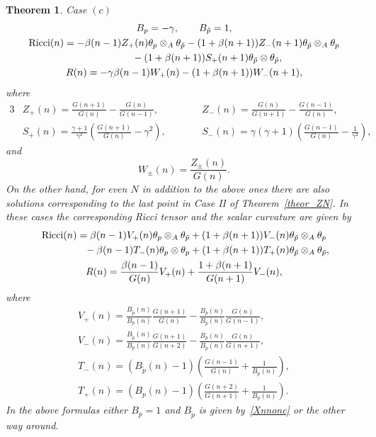\documentclass[10pt,a4paper]{amsart}
\numberwithin{equation}{section}
\newtheorem{Theorem}{Theorem}[section]
\newcommand{\ip}{{\tilde{p}}}
\begin{document}
\begin{Theorem}
Case $(c)$
\begin{gather*}
 B_p=-\gamma, \qquad B_\ip=1, \\
{\rm Ricci}(n) = -\beta(n-1)Z_+(n)\theta_p\otimes_A\theta_{\ip}-(1+\beta(n+1))Z_-(n+1)\theta_\ip\otimes_A\theta_p\\
\hphantom{{\rm Ricci}(n) =}{} -(1+\beta(n+1))S_+(n+1)\theta_\ip\otimes\theta_\ip,\\
R(n) =-\gamma\beta(n-1)W_+(n)-(1+\beta(n+1))W_-(n+1),
\end{gather*}
where
\begin{alignat*}{3}
 &Z_+(n) = \frac{G(n+1)}{G(n)}-\frac{G(n)}{G(n-1)},\qquad && Z_-(n) = \frac{G(n)}{G(n+1)}-\frac{G(n-1)}{G(n)},& \\
 & S_+(n)=\frac{\gamma+1}{\gamma^2}\left(\frac{G(n+1)}{G(n)}-\gamma^2\right),\qquad && S_-(n)=\gamma(\gamma+1)\left(\frac{G(n-1)}{G(n)}-\frac{1}{\gamma^2}\right),&
\end{alignat*}
and
\[
W_\pm(n) = \frac{Z_\pm(n)}{G(n)}.
\]
On the other hand, for even $N$ in addition to the above ones there are also solutions corresponding to the last point in Case II of Theorem~{\rm \ref{theor_ZN}}. In these cases the corresponding Ricci tensor and the scalar curvature are given by
\begin{gather*}
{\rm Ricci}(n) =\beta(n-1)V_+(n)\theta_p\otimes_A\theta_\ip+(1+\beta(n+1))V_-(n)\theta_\ip\otimes_A\theta_p\\
\hphantom{{\rm Ricci}(n) =}{} -\beta(n-1)T_-(n)\theta_p\otimes \theta_p +(1+\beta(n+1))T_+(n)\theta_\ip\otimes_A\theta_\ip, \\
 R(n)=\frac{\beta(n-1)}{G(n)}V_+(n)+\frac{1+\beta(n+1)}{G(n+1)}V_-(n),
\end{gather*}
where
\begin{gather*}
 V_+(n)=\frac{B_\ip(n)}{B_p(n)}\frac{G(n+1)}{G(n)}-\frac{B_p(n)}{B_\ip(n)}\frac{G(n)}{G(n-1)}, \\ V_-(n)=\frac{B_\ip(n)}{B_p(n)}\frac{G(n+1)}{G(n+2)}-\frac{B_p(n)}{B_\ip(n)}\frac{G(n)}{G(n+1)},\\
T_-(n)=(B_\ip(n)-1)\left(\frac{G(n-1)}{G(n)}+\frac{1}{B_\ip(n)}\right), \\ T_+(n)=(B_p(n)-1)\left(\frac{G(n+2)}{G(n+1)}+\frac{1}{B_p(n)}\right).
\end{gather*}
In the above formulas either $B_p=1$ and $B_\ip$ is given by~\eqref{Xnnonc} or the other way around.
\end{Theorem}
\end{document}
